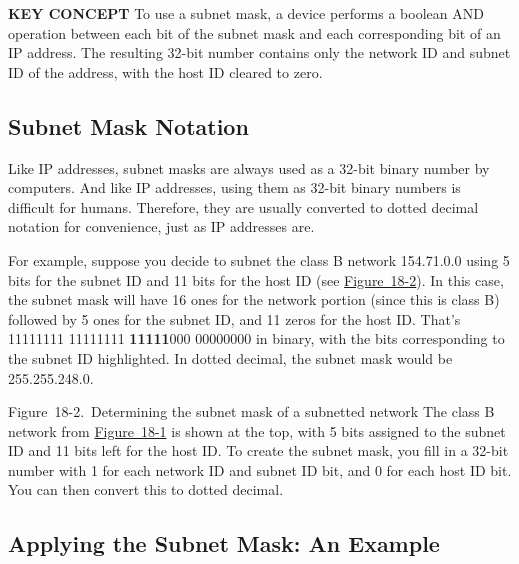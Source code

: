 \documentclass[b5paper,11pt]{memoir}
\begin{document}
{\textbf{KEY CONCEPT}} To use a subnet mask, a device performs a boolean
AND operation between each bit of the subnet mask and each corresponding
bit of an IP address. The resulting 32-bit number contains only the
network ID and subnet ID of the address, with the host ID cleared to
zero.



\subsection{Subnet Mask Notation}

Like IP addresses, subnet
\protect\hypertarget{ch18s03.htmlux5cux23idx-CHP-18-0724}{}{}masks are
always used as a 32-bit binary number by computers. And like IP
addresses, using them as 32-bit binary numbers is difficult for humans.
Therefore, they are usually converted to dotted decimal notation for
convenience, just as IP addresses are.

For example, suppose you
\protect\hypertarget{ch18s03.htmlux5cux23idx-CHP-18-0725}{}{}decide to
subnet the class B network 154.71.0.0 using 5 bits for the subnet ID and
11 bits for the host ID (see
\protect\hyperlink{ch18s03.htmlux5cux23determining_the_subnet_mask_of_a_subnett}{Figure~18-2}).
In this case, the subnet mask will have 16 ones for the network portion
(since this is class B) followed by 5 ones for the subnet ID, and 11
zeros for the host ID. That's 11111111 11111111 {\textbf{11111}}000
00000000 in binary, with the bits corresponding to the subnet ID
highlighted. In dotted decimal, the subnet mask would be 255.255.248.0.

\protect\hypertarget{ch18s03.htmlux5cux23determining_the_subnet_mask_of_a_subnett}{}{}

\protect\hypertarget{ch18s03.htmlux5cux23I_mediaobject4_d1e18274}{}{}

Figure~18-2.~Determining the subnet mask of a subnetted network The
class B network from
\protect\hyperlink{ch18s02.htmlux5cux23subnetting_class_b_network_we_begin_with}{Figure~18-1}
is shown at the top, with 5 bits assigned to the subnet ID and 11 bits
left for the host ID. To create the subnet mask, you fill in a 32-bit
number with 1 for each network ID and subnet ID bit, and 0 for each host
ID bit. You can then convert this to dotted decimal.

\subsection{Applying the Subnet Mask: An Example}
\end{document}
